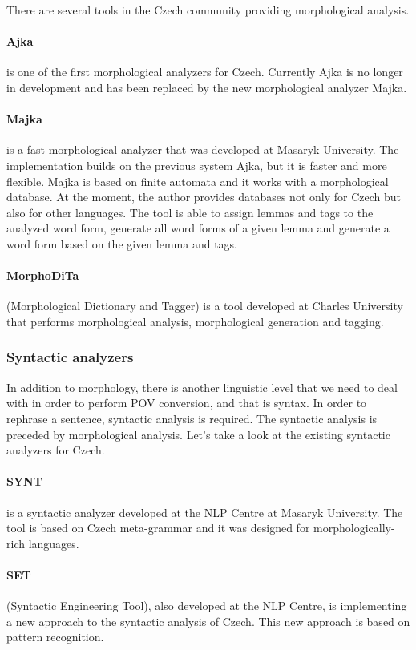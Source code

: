 There are several tools in the Czech community providing morphological analysis.

\paragraph{Ajka}

is one of the first morphological analyzers for Czech. Currently Ajka is no longer in development and has been replaced by the new morphological analyzer Majka. \cite{Sedlacekthesis}

\paragraph{Majka}

is a fast morphological analyzer that was developed at Masaryk University. The implementation builds on the previous system Ajka, but it is faster and more flexible. Majka is based on finite automata and it works with a morphological database. At the moment, the author provides databases not only for Czech but also for other languages. The tool is able to assign lemmas and tags to the analyzed word form, generate all word forms of a given lemma and generate a word form based on the given lemma and tags. \cite{majka}

\paragraph{MorphoDiTa} (Morphological Dictionary and Tagger) is a tool developed at Charles University that performs morphological analysis, morphological generation and tagging. \cite{strakova14}

\subsubsection{Syntactic analyzers}

In addition to morphology, there is another linguistic level that we need to deal with in order to perform POV conversion, and that is syntax. In order to rephrase a sentence, syntactic analysis is required. The syntactic analysis is preceded by morphological analysis. Let's take a look at the existing syntactic analyzers for Czech.

\paragraph{SYNT} is a syntactic analyzer developed at the NLP Centre at Masaryk University. The tool is based on Czech meta-grammar and it was designed for morphologically-rich languages.

\paragraph{SET} (Syntactic Engineering Tool), also developed at the NLP Centre, is implementing a new approach to the syntactic analysis of Czech. This new approach is based on pattern recognition. \cite{set}

